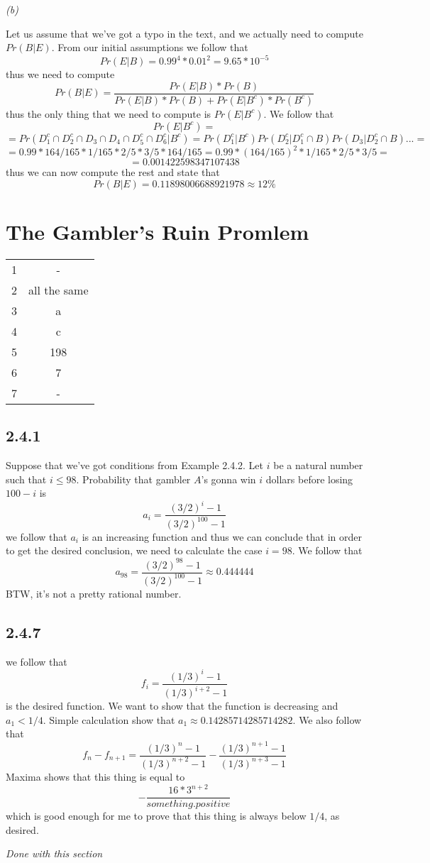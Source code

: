 \documentclass[11pt,oneside,titlepage]{book}
\begin{document}
\textit{(b)}

Let us assume that we've got a typo in the text, and we actually need to compute $Pr(B|E)$.
From our initial assumptions we follow that
$$Pr(E|B) = 0.99^4 * 0.01^2 = 9.65 * 10^{-5}$$
thus we need to compute
$$Pr(B|E) = \frac{Pr(E|B) * Pr(B)}{Pr(E|B) * Pr(B) + Pr(E|B^c) * Pr(B^c)}$$
thus the only thing that we need to compute is $Pr(E|B^c)$.
We follow that
$$Pr(E | B^c) = $$
$$ = Pr(D_1^c \cap D_2^c \cap D_3 \cap D_4 \cap D_5^c \cap D_6^c | B^c) =
Pr(D_1^c|B^c) Pr(D_2^c |D_1^c \cap B) Pr(D_3| D_2^c \cap B) ...  = $$
$$ = 0.99 * 164/165 * 1/165 * 2/5 * 3/5 * 164/165 = 0.99 * (164/165)^2 * 1/165 * 2/5 * 3/5  = $$
$$ =  0.001422598347107438$$
thus we can now compute the rest and state that
$$Pr(B|E) = 0.11898006688921978 \approx 12\%$$

\section{The Gambler's Ruin Promlem}

\begin{tabular}[center]{||c | c|| }
  \hline
  1 & - \\
  2 & all the same \\
  3 & a \\
  4 & c \\
  5 & 198 \\
  6 & 7 \\
  7 & - \\
  \hline 
\end{tabular}

\subsection*{2.4.1}

Suppose that we've got conditions from Example 2.4.2. Let $i$ be a natural number such that
$i \leq 98$. Probability that gambler $A$'s gonna win $i$ dollars before losing $100 - i$ is
$$a_i = \frac{(3/2)^i - 1}{(3/2)^{100} - 1}$$
we follow that $a_i$ is an increasing function and thus we can conclude that in order to
get the desired conclusion, we need to calculate the case $i = 98$. We follow that
$$a_{98} = \frac{(3/2)^{98} - 1}{(3/2)^{100} - 1} \approx 0.444444$$
BTW, it's not a pretty rational number.

\subsection*{2.4.7}

we follow that
$$f_i = \frac{(1/3)^i - 1}{(1/3)^{i + 2} - 1}$$
is the desired function. We want to show that the function is decreasing and $a_1 < 1/4$.
Simple calculation show that $a_1 \approx 0.14285714285714282$. We also follow that
$$f_n - f_{n + 1} = \frac{(1/3)^n - 1}{(1/3)^{n + 2} - 1} -
\frac{(1/3)^{n + 1} - 1}{(1/3)^{n + 3} - 1}$$
Maxima shows that this thing is equal to
$$- \frac{16 * 3^{n + 2}}{something . positive}$$
which is good enough for me to prove that this thing is always below $1/4$, as desired.

\textit{Done with this section}
\end{document}

